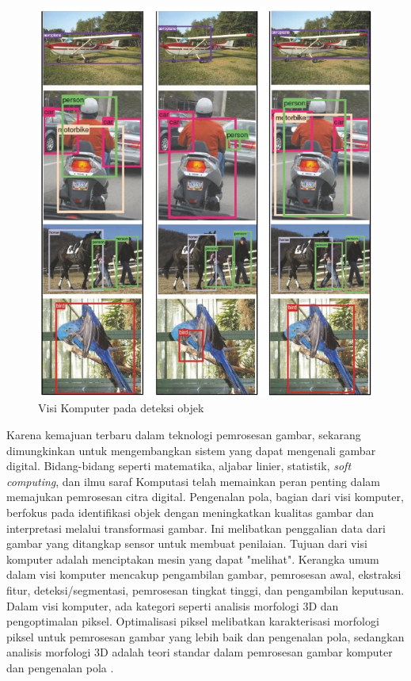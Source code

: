 \begin{figure}[H]
  \centering
  \includegraphics[scale=0.5]{gambar/computervision.png}
  \caption{Visi Komputer pada deteksi objek \parencite{Shetty}}
  \label{fig:visikomdeteksi}
\end{figure}

Karena kemajuan terbaru dalam teknologi pemrosesan gambar, sekarang dimungkinkan untuk mengembangkan sistem yang dapat mengenali gambar digital. Bidang-bidang seperti matematika, aljabar linier, statistik, \emph{soft computing}, dan ilmu saraf Komputasi telah memainkan peran penting dalam memajukan pemrosesan citra digital. Pengenalan pola, bagian dari visi komputer, berfokus pada identifikasi objek dengan meningkatkan kualitas gambar dan interpretasi melalui transformasi gambar. Ini melibatkan penggalian data dari gambar yang ditangkap sensor untuk membuat penilaian. Tujuan dari visi komputer adalah menciptakan mesin yang dapat "melihat". Kerangka umum dalam visi komputer mencakup pengambilan gambar, pemrosesan awal, ekstraksi fitur, deteksi/segmentasi, pemrosesan tingkat tinggi, dan pengambilan keputusan. Dalam visi komputer, ada kategori seperti analisis morfologi 3D dan pengoptimalan piksel. Optimalisasi piksel melibatkan karakterisasi morfologi piksel untuk pemrosesan gambar yang lebih baik dan pengenalan pola, sedangkan analisis morfologi 3D adalah teori standar dalam pemrosesan gambar komputer dan pengenalan pola \parencite{Kotappa}.

